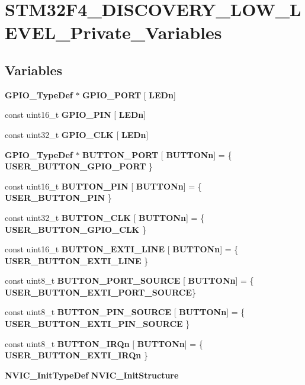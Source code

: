 \section{S\+T\+M32\+F4\+\_\+\+D\+I\+S\+C\+O\+V\+E\+R\+Y\+\_\+\+L\+O\+W\+\_\+\+L\+E\+V\+E\+L\+\_\+\+Private\+\_\+\+Variables}
\label{group__STM32F4__DISCOVERY__LOW__LEVEL__Private__Variables}
\subsection*{Variables}
\begin{DoxyCompactItemize}
\item 
\textbf{ G\+P\+I\+O\+\_\+\+Type\+Def} $\ast$ \textbf{ G\+P\+I\+O\+\_\+\+P\+O\+RT} [\textbf{ L\+E\+Dn}]
\item 
const uint16\+\_\+t \textbf{ G\+P\+I\+O\+\_\+\+P\+IN} [\textbf{ L\+E\+Dn}]
\item 
const uint32\+\_\+t \textbf{ G\+P\+I\+O\+\_\+\+C\+LK} [\textbf{ L\+E\+Dn}]
\item 
\textbf{ G\+P\+I\+O\+\_\+\+Type\+Def} $\ast$ \textbf{ B\+U\+T\+T\+O\+N\+\_\+\+P\+O\+RT} [\textbf{ B\+U\+T\+T\+O\+Nn}] = \{\textbf{ U\+S\+E\+R\+\_\+\+B\+U\+T\+T\+O\+N\+\_\+\+G\+P\+I\+O\+\_\+\+P\+O\+RT} \}
\item 
const uint16\+\_\+t \textbf{ B\+U\+T\+T\+O\+N\+\_\+\+P\+IN} [\textbf{ B\+U\+T\+T\+O\+Nn}] = \{\textbf{ U\+S\+E\+R\+\_\+\+B\+U\+T\+T\+O\+N\+\_\+\+P\+IN} \}
\item 
const uint32\+\_\+t \textbf{ B\+U\+T\+T\+O\+N\+\_\+\+C\+LK} [\textbf{ B\+U\+T\+T\+O\+Nn}] = \{\textbf{ U\+S\+E\+R\+\_\+\+B\+U\+T\+T\+O\+N\+\_\+\+G\+P\+I\+O\+\_\+\+C\+LK} \}
\item 
const uint16\+\_\+t \textbf{ B\+U\+T\+T\+O\+N\+\_\+\+E\+X\+T\+I\+\_\+\+L\+I\+NE} [\textbf{ B\+U\+T\+T\+O\+Nn}] = \{\textbf{ U\+S\+E\+R\+\_\+\+B\+U\+T\+T\+O\+N\+\_\+\+E\+X\+T\+I\+\_\+\+L\+I\+NE} \}
\item 
const uint8\+\_\+t \textbf{ B\+U\+T\+T\+O\+N\+\_\+\+P\+O\+R\+T\+\_\+\+S\+O\+U\+R\+CE} [\textbf{ B\+U\+T\+T\+O\+Nn}] = \{\textbf{ U\+S\+E\+R\+\_\+\+B\+U\+T\+T\+O\+N\+\_\+\+E\+X\+T\+I\+\_\+\+P\+O\+R\+T\+\_\+\+S\+O\+U\+R\+CE}\}
\item 
const uint8\+\_\+t \textbf{ B\+U\+T\+T\+O\+N\+\_\+\+P\+I\+N\+\_\+\+S\+O\+U\+R\+CE} [\textbf{ B\+U\+T\+T\+O\+Nn}] = \{\textbf{ U\+S\+E\+R\+\_\+\+B\+U\+T\+T\+O\+N\+\_\+\+E\+X\+T\+I\+\_\+\+P\+I\+N\+\_\+\+S\+O\+U\+R\+CE} \}
\item 
const uint8\+\_\+t \textbf{ B\+U\+T\+T\+O\+N\+\_\+\+I\+R\+Qn} [\textbf{ B\+U\+T\+T\+O\+Nn}] = \{\textbf{ U\+S\+E\+R\+\_\+\+B\+U\+T\+T\+O\+N\+\_\+\+E\+X\+T\+I\+\_\+\+I\+R\+Qn} \}
\item 
\textbf{ N\+V\+I\+C\+\_\+\+Init\+Type\+Def} \textbf{ N\+V\+I\+C\+\_\+\+Init\+Structure}
\end{DoxyCompactItemize}


